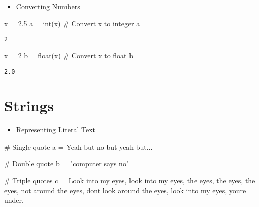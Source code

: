 \documentclass[
  letterpaper,
  DIV=11,
  numbers=noendperiod]{scrreprt}
\newenvironment{Shaded}{\begin{snugshade}}{\end{snugshade}}
\newcommand{\BuiltInTok}[1]{\textcolor[rgb]{0.00,0.46,0.62}{#1}}
\newcommand{\CommentTok}[1]{\textcolor[rgb]{0.37,0.37,0.37}{#1}}
\newcommand{\DecValTok}[1]{\textcolor[rgb]{0.68,0.00,0.00}{#1}}
\newcommand{\FloatTok}[1]{\textcolor[rgb]{0.68,0.00,0.00}{#1}}
\newcommand{\NormalTok}[1]{\textcolor[rgb]{0.00,0.46,0.62}{#1}}
\newcommand{\OperatorTok}[1]{\textcolor[rgb]{0.37,0.37,0.37}{#1}}
\newcommand{\StringTok}[1]{\textcolor[rgb]{0.13,0.47,0.30}{#1}}
\providecommand{\tightlist}{%
  \setlength{\itemsep}{0pt}\setlength{\parskip}{0pt}}
\begin{document}
\begin{itemize}
\tightlist
\item
  Converting Numbers
\end{itemize}

\begin{Shaded}
\begin{Highlighting}[]
\NormalTok{x }\OperatorTok{=} \FloatTok{2.5}
\NormalTok{a }\OperatorTok{=} \BuiltInTok{int}\NormalTok{(x)    }\CommentTok{\# Convert x to integer}
\NormalTok{a}
\end{Highlighting}
\end{Shaded}

\begin{verbatim}
2
\end{verbatim}

\begin{Shaded}
\begin{Highlighting}[]
\NormalTok{x }\OperatorTok{=} \DecValTok{2}
\NormalTok{b }\OperatorTok{=} \BuiltInTok{float}\NormalTok{(x)  }\CommentTok{\# Convert x to float}
\NormalTok{b}
\end{Highlighting}
\end{Shaded}

\begin{verbatim}
2.0
\end{verbatim}

\hypertarget{strings}{%
\section{Strings}\label{strings}}

\begin{itemize}
\tightlist
\item
  Representing Literal Text
\end{itemize}

\begin{Shaded}
\begin{Highlighting}[]
\CommentTok{\# Single quote}
\NormalTok{a }\OperatorTok{=} \StringTok{\textquotesingle{}Yeah but no but yeah but...\textquotesingle{}}

\CommentTok{\# Double quote}
\NormalTok{b }\OperatorTok{=} \StringTok{"computer says no"}

\CommentTok{\# Triple quotes}
\NormalTok{c }\OperatorTok{=} \StringTok{\textquotesingle{}\textquotesingle{}\textquotesingle{}}
\StringTok{Look into my eyes, look into my eyes, the eyes, the eyes, the eyes,}
\StringTok{not around the eyes,}
\StringTok{don\textquotesingle{}t look around the eyes,}
\StringTok{look into my eyes, you\textquotesingle{}re under.}
\StringTok{\textquotesingle{}\textquotesingle{}\textquotesingle{}}
\end{Highlighting}
\end{Shaded}
\end{document}
